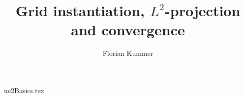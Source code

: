 \documentclass[10pt,a4paper]{article}
\title{Grid instantiation, $L^2$-projection and convergence}
\author{Florian Kummer}
\begin{document}
\maketitle

{ue2Basics.tex}
\end{document}
